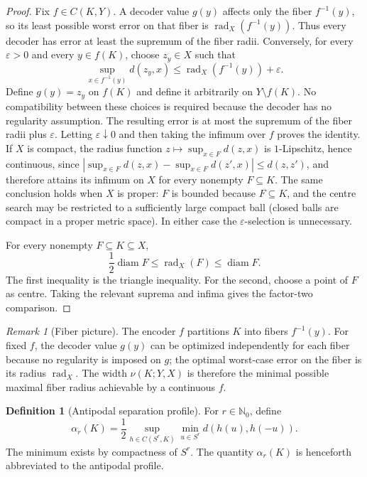 \documentclass[11pt,a4paper]{article}
\theoremstyle{definition}
\newtheorem{definition}{Definition}[section]
\theoremstyle{plain}
\theoremstyle{remark}
\newtheorem{remark}[theorem]{Remark}
\DeclareMathOperator{\rad}{rad}
\DeclareMathOperator{\diam}{diam}
\begin{document}
\begin{proof}
Fix $f\in C(K,Y)$. A decoder value $g(y)$ affects only the fiber
$f^{-1}(y)$, so its least possible worst error on that fiber is
$\rad_X(f^{-1}(y))$. Thus every decoder has error at least the supremum of
the fiber radii. Conversely, for every $\varepsilon>0$ and every
$y\in f(K)$, choose $z_y\in X$ such that
\[
\sup_{x\in f^{-1}(y)}d(z_y,x)
\leq\rad_X(f^{-1}(y))+\varepsilon.
\]
Define $g(y)=z_y$ on $f(K)$ and define it arbitrarily on $Y\setminus f(K)$.
No compatibility between these choices is required because the decoder has
no regularity assumption. The resulting error is at most the supremum of
the fiber radii plus $\varepsilon$. Letting $\varepsilon\downarrow0$ and
then taking the infimum over $f$ proves the identity. If $X$ is compact,
the radius function
$z\mapsto\sup_{x\in F}d(z,x)$ is $1$-Lipschitz, hence continuous, since
$|\sup_{x\in F}d(z,x)-\sup_{x\in F}d(z',x)|\le d(z,z')$, and therefore attains its infimum on $X$ for every
nonempty $F\subseteq K$. The same conclusion holds when $X$ is proper:
$F$ is bounded because $F\subseteq K$, and the centre search may be
restricted to a sufficiently large compact ball (closed balls are compact in a proper metric space). In either case the
$\varepsilon$-selection is unnecessary.

For every nonempty $F\subseteq K\subseteq X$,
\[
\frac12\diam F\leq\rad_X(F)\leq\diam F.
\]
The first inequality is the triangle inequality. For the second, choose a
point of $F$ as centre. Taking the relevant suprema and infima gives the
factor-two comparison.
\end{proof}

\begin{remark}[Fiber picture]
The encoder $f$ partitions $K$ into fibers $f^{-1}(y)$. For fixed $f$, the decoder value $g(y)$ can be optimized independently for each fiber because no regularity is imposed on $g$; the optimal worst-case error on the fiber is its radius $\rad_X$. The width $\nu(K;Y,X)$ is therefore the minimal possible maximal fiber radius achievable by a continuous $f$.
\end{remark}

\begin{definition}[Antipodal separation profile]
\label{def:profile}
For $r\in\mathbb N_0$, define
\[
\alpha_r(K)
=\frac12\sup_{h\in C(S^r,K)}
\min_{u\in S^r}d(h(u),h(-u)).
\]
The minimum exists by compactness of $S^r$. The quantity $\alpha_r(K)$
is henceforth abbreviated to the antipodal profile.
\end{definition}
\end{document}
